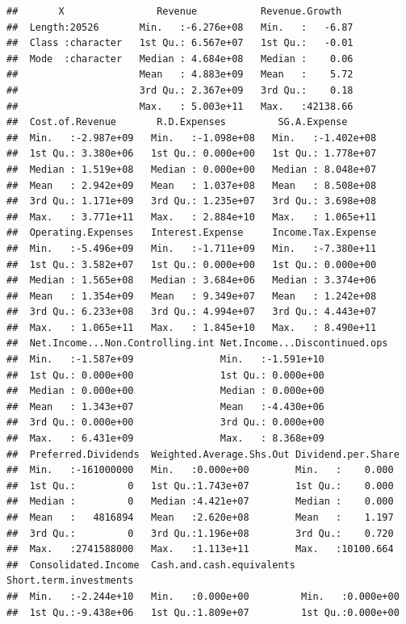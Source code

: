 \documentclass[11pt,]{article}
\begin{document}
\begin{verbatim}
##       X                Revenue           Revenue.Growth    
##  Length:20526       Min.   :-6.276e+08   Min.   :   -6.87  
##  Class :character   1st Qu.: 6.567e+07   1st Qu.:   -0.01  
##  Mode  :character   Median : 4.684e+08   Median :    0.06  
##                     Mean   : 4.883e+09   Mean   :    5.72  
##                     3rd Qu.: 2.367e+09   3rd Qu.:    0.18  
##                     Max.   : 5.003e+11   Max.   :42138.66  
##  Cost.of.Revenue       R.D.Expenses         SG.A.Expense       
##  Min.   :-2.987e+09   Min.   :-1.098e+08   Min.   :-1.402e+08  
##  1st Qu.: 3.380e+06   1st Qu.: 0.000e+00   1st Qu.: 1.778e+07  
##  Median : 1.519e+08   Median : 0.000e+00   Median : 8.048e+07  
##  Mean   : 2.942e+09   Mean   : 1.037e+08   Mean   : 8.508e+08  
##  3rd Qu.: 1.171e+09   3rd Qu.: 1.235e+07   3rd Qu.: 3.698e+08  
##  Max.   : 3.771e+11   Max.   : 2.884e+10   Max.   : 1.065e+11  
##  Operating.Expenses   Interest.Expense     Income.Tax.Expense  
##  Min.   :-5.496e+09   Min.   :-1.711e+09   Min.   :-7.380e+11  
##  1st Qu.: 3.582e+07   1st Qu.: 0.000e+00   1st Qu.: 0.000e+00  
##  Median : 1.565e+08   Median : 3.684e+06   Median : 3.374e+06  
##  Mean   : 1.354e+09   Mean   : 9.349e+07   Mean   : 1.242e+08  
##  3rd Qu.: 6.233e+08   3rd Qu.: 4.994e+07   3rd Qu.: 4.443e+07  
##  Max.   : 1.065e+11   Max.   : 1.845e+10   Max.   : 8.490e+11  
##  Net.Income...Non.Controlling.int Net.Income...Discontinued.ops
##  Min.   :-1.587e+09               Min.   :-1.591e+10           
##  1st Qu.: 0.000e+00               1st Qu.: 0.000e+00           
##  Median : 0.000e+00               Median : 0.000e+00           
##  Mean   : 1.343e+07               Mean   :-4.430e+06           
##  3rd Qu.: 0.000e+00               3rd Qu.: 0.000e+00           
##  Max.   : 6.431e+09               Max.   : 8.368e+09           
##  Preferred.Dividends  Weighted.Average.Shs.Out Dividend.per.Share 
##  Min.   :-161000000   Min.   :0.000e+00        Min.   :    0.000  
##  1st Qu.:         0   1st Qu.:1.743e+07        1st Qu.:    0.000  
##  Median :         0   Median :4.421e+07        Median :    0.000  
##  Mean   :   4816894   Mean   :2.620e+08        Mean   :    1.197  
##  3rd Qu.:         0   3rd Qu.:1.196e+08        3rd Qu.:    0.720  
##  Max.   :2741588000   Max.   :1.113e+11        Max.   :10100.664  
##  Consolidated.Income  Cash.and.cash.equivalents Short.term.investments
##  Min.   :-2.244e+10   Min.   :0.000e+00         Min.   :0.000e+00     
##  1st Qu.:-9.438e+06   1st Qu.:1.809e+07         1st Qu.:0.000e+00     

\end{verbatim}
\end{document}
